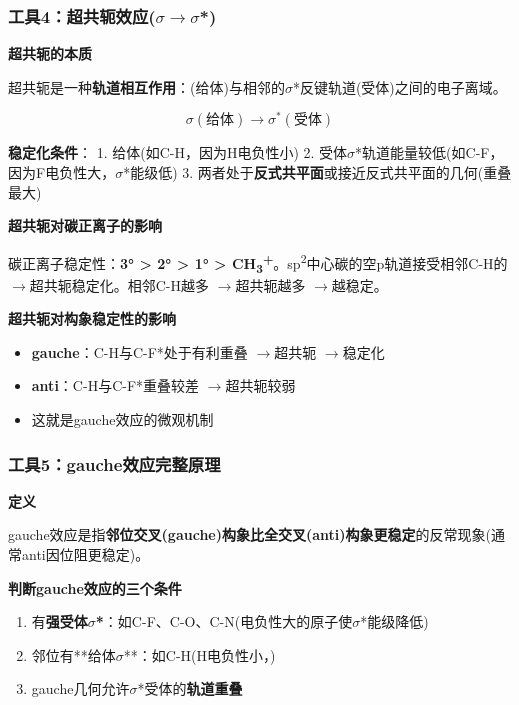 \documentclass[a4paper,11pt]{ctexart}
\providecommand{\tightlist}{\setlength{\itemsep}{0pt}\setlength{\parskip}{0pt}}
\newcommand{\箭}{\ensuremath{\rightarrow}}
\newcommand{\左箭}{\ensuremath{\leftarrow}}
\newcommand{\上箭}{\ensuremath{\uparrow}}
\newcommand{\下箭}{\ensuremath{\downarrow}}
\newcommand{\衡}{\ensuremath{\rightleftharpoons}}
\newcommand{\双箭}{\ensuremath{\leftrightarrow}}
\newcommand{\约等于}{\ensuremath{\approx}}
\newcommand{\小于等于}{\ensuremath{\leq}}
\newcommand{\大于等于}{\ensuremath{\geq}}
\newcommand{\不等于}{\ensuremath{\neq}}
\newcommand{\西格马}{\ensuremath{\sigma}}
\newcommand{\派}{\ensuremath{\pi}}
\begin{document}
\subsubsection{\texorpdfstring{工具4：超共轭效应(\西格马\箭\西格马*)}{工具4：超共轭效应(*)}}\label{ux5de5ux51774ux8d85ux5171ux8f6dux6548ux5e94}

\textbf{超共轭的本质}

超共轭是一种\textbf{轨道相互作用}：(给体)与相邻的\西格马*反键轨道(受体)之间的电子离域。

\[\sigma(\text{给体}) \rightarrow \sigma^*(\text{受体})\]

\textbf{稳定化条件}：
1. 给体(如C-H，因为H电负性小)
2. 受体\西格马*轨道能量较低(如C-F，因为F电负性大，\西格马*能级低)
3. 两者处于\textbf{反式共平面}或接近反式共平面的几何(重叠最大)

\textbf{超共轭对碳正离子的影响}

碳正离子稳定性：\textbf{3° \textgreater{} 2° \textgreater{} 1° \textgreater{} CH\textsubscript{3}\textsuperscript{+}}。sp\textsuperscript{2}中心碳的空p轨道接受相邻C-H的 \箭 超共轭稳定化。相邻C-H越多 \箭 超共轭越多 \箭 越稳定。

\textbf{超共轭对构象稳定性的影响}

\begin{itemize}
\tightlist
\item
  \textbf{gauche}：C-H与C-F*处于有利重叠 \箭 超共轭 \箭 稳定化
\item
  \textbf{anti}：C-H与C-F*重叠较差 \箭 超共轭较弱
\item
  这就是gauche效应的微观机制
\end{itemize}

\subsubsection{工具5：gauche效应完整原理}\label{ux5de5ux51775gaucheux6548ux5e94ux5b8cux6574ux539fux7406}

\textbf{定义}

gauche效应是指\textbf{邻位交叉(gauche)构象比全交叉(anti)构象更稳定}的反常现象(通常anti因位阻更稳定)。

\textbf{判断gauche效应的三个条件}

\begin{enumerate}
\def\labelenumi{\arabic{enumi}.}
\tightlist
\item
  有\textbf{强受体\西格马*}：如C-F、C-O、C-N(电负性大的原子使\西格马*能级降低)
\item
  邻位有**给体\西格马**：如C-H(H电负性小，)
\item
  gauche几何允许\西格马*受体的\textbf{轨道重叠}
\end{enumerate}
\end{document}
